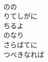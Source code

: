 \documentclass[10pt,b5j]{tarticle} %
\begin{document}
\begin{enumerate}
\begin{minipage}[c]{\blocksize}
        \vspace{\linespace}
        \item~\\
        のの\\
        りてしがに\\
        ちるよ\\
        のなり\\
        さらばてに\\
        つべきなれば
    
    \end{minipage}
\end{enumerate} %
\end{document}
